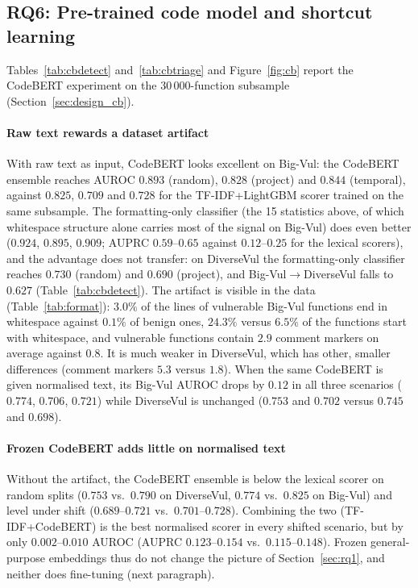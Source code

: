 \subsection{RQ6: Pre-trained code model and shortcut learning}\label{sec:rq6}
Tables~\ref{tab:cbdetect} and~\ref{tab:cbtriage} and Figure~\ref{fig:cb} report the CodeBERT experiment on the 30\,000-function subsample (Section~\ref{sec:design_cb}).

\paragraph{Raw text rewards a dataset artifact}
With raw text as input, CodeBERT looks excellent on Big-Vul: the CodeBERT ensemble reaches AUROC $0.893$ (random), $0.828$ (project) and $0.844$ (temporal), against $0.825$, $0.709$ and $0.728$ for the TF-IDF+LightGBM scorer trained on the same subsample. The formatting-only classifier (the 15 statistics above, of which whitespace structure alone carries most of the signal on Big-Vul) does even better ($0.924$, $0.895$, $0.909$; AUPRC $0.59$--$0.65$ against $0.12$--$0.25$ for the lexical scorers), and the advantage does not transfer: on DiverseVul the formatting-only classifier reaches $0.730$ (random) and $0.690$ (project), and Big-Vul$\to$DiverseVul falls to $0.627$ (Table~\ref{tab:cbdetect}). The artifact is visible in the data (Table~\ref{tab:format}): $3.0\%$ of the lines of vulnerable Big-Vul functions end in whitespace against $0.1\%$ of benign ones, $24.3\%$ versus $6.5\%$ of the functions start with whitespace, and vulnerable functions contain $2.9$ comment markers on average against $0.8$. It is much weaker in DiverseVul, which has other, smaller differences (comment markers $5.3$ versus $1.8$). When the same CodeBERT is given normalised text, its Big-Vul AUROC drops by $0.12$ in all three scenarios ($0.774$, $0.706$, $0.721$) while DiverseVul is unchanged ($0.753$ and $0.702$ versus $0.745$ and $0.698$).

\paragraph{Frozen CodeBERT adds little on normalised text}
Without the artifact, the CodeBERT ensemble is below the lexical scorer on random splits ($0.753$ vs.\ $0.790$ on DiverseVul, $0.774$ vs.\ $0.825$ on Big-Vul) and level under shift ($0.689$--$0.721$ vs.\ $0.701$--$0.728$). Combining the two (TF-IDF+CodeBERT) is the best normalised scorer in every shifted scenario, but by only $0.002$--$0.010$ AUROC (AUPRC $0.123$--$0.154$ vs.\ $0.115$--$0.148$). Frozen general-purpose embeddings thus do not change the picture of Section~\ref{sec:rq1}, and neither does fine-tuning (next paragraph).


